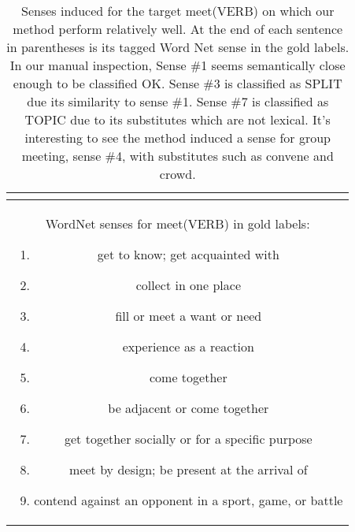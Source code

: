 \documentclass[11pt,a4paper]{article}
\begin{document}
\begin{table*}[htp!]
\begin{tabularx}{\linewidth}{| c |  c| X | }
{\begin{itemize}[topsep=0pt,itemsep=0pt, parsep=0pt]
    \end{itemize}}\\
  \hline\hline
    \multicolumn{3}{|p{0.95\linewidth}|}{
    WordNet senses for meet(VERB) in gold labels:
    \begin{multicols}{2}
    \begin{enumerate}[topsep=2pt,itemsep=0pt,partopsep=0pt, parsep=0pt]
        \item get to know; get acquainted with 
        \item collect in one place
        \item fill or meet a want or need
        \item experience as a reaction
        \item come together
        \item be adjacent or come together
        \item get together socially or for a specific purpose
        \item meet by design; be present at the arrival of
        \item contend against an opponent in a sport, game, or battle
        
    \end{enumerate}
    \end{multicols}}
    
    \\
  
  \hline
\end{tabularx}
\caption{Senses induced for the target meet(VERB) on which our method perform relatively well. At the end of each sentence in parentheses is its tagged Word Net sense in the gold labels. In our manual inspection, Sense \#1 seems semantically close enough to be classified OK. Sense \#3 is classified as SPLIT due its similarity to sense \#1. Sense \#7 is classified as TOPIC due to its substitutes which are not lexical. It's interesting to see the method induced a sense for group meeting, sense \#4, with substitutes such as convene and crowd. }
  \label{tab:examples}
\end{table*}
\end{document}
